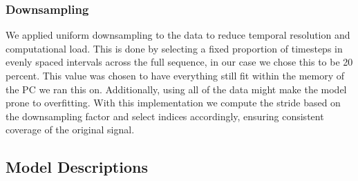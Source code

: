 \documentclass[conference]{IEEEtran}
\begin{document}
\subsubsection{Downsampling}
We applied uniform downsampling to the data to reduce temporal resolution and computational load. 
This is done by selecting a fixed proportion of timesteps in evenly spaced intervals across the full sequence, in our case we chose this to be 20 percent. This value was chosen to have everything still fit within the memory of the PC we ran this on. Additionally, using all of the data might make the model prone to overfitting. With this implementation we compute the stride based on the downsampling factor and select indices accordingly, ensuring consistent coverage of the original signal. 

\subsection{Model Descriptions}
\end{document}
